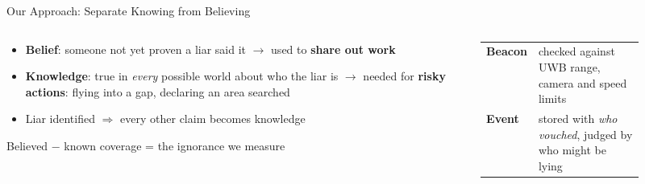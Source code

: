 \documentclass[aspectratio=169,10pt]{beamer}
\begin{document}
\begin{frame}{Our Approach: Separate Knowing from Believing}
\begin{columns}[c]
\begin{column}{0.42\textwidth}
\begin{itemize}
  \item \textbf{Belief}: someone not yet proven a liar said it $\rightarrow$ used to \textbf{share out work}
  \item \textbf{Knowledge}: true in \emph{every} possible world about who the liar is $\rightarrow$ needed for \textbf{risky actions}: flying into a gap, declaring an area searched
  \item Liar identified $\Rightarrow$ every other claim becomes knowledge
\end{itemize}
\vspace{0.3em}
{\small Believed $-$ known coverage = \alert{the ignorance} we measure}
\end{column}
\begin{column}{0.56\textwidth}
\centering
{}

\vspace{0.6em}
\footnotesize
\renewcommand{\arraystretch}{1.2}
\begin{tabular}{@{}l p{0.72\linewidth}@{}}
\textbf{Beacon} & checked against UWB range, camera and speed limits \\
\textbf{Event}  & stored with \emph{who vouched}, judged by who might be lying \\
\end{tabular}
\end{column}
\end{columns}
\end{frame}
\end{document}
